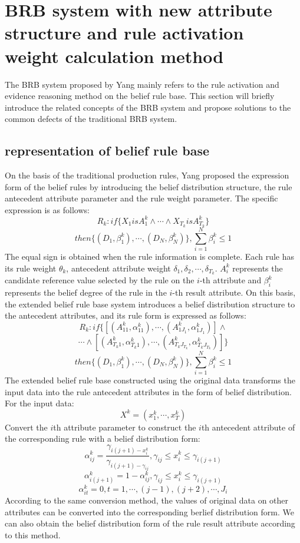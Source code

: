 \documentclass{ieeeaccess}
\begin{document}
\section{BRB system with new attribute structure and rule activation weight calculation method}
The BRB system proposed by Yang mainly refers to the rule activation and evidence reasoning method on the belief rule base. This section will briefly introduce
the related concepts of the BRB system and propose solutions to the common defects of the traditional BRB system.
\subsection{representation of belief rule base}
On the basis of the traditional production rules, Yang\cite{a1} proposed the expression form of the belief rules by introducing the belief distribution structure,
the rule antecedent attribute parameter and the rule weight parameter. The specific expression is as follows:
$$R_k:if\{X_1isA_1^k \wedge \cdots \wedge X_{T_k}isA_{T_k}^k\}$$
$$then\{(D_1,\beta_1^k),\cdots,(D_N,\beta_N^k)\},\sum_{i=1}^N\beta_i^k\leq1$$
The equal sign is obtained when the rule information is complete. Each rule has its rule weight $\theta_k$, antecedent attribute weight $\delta_{1},\delta_{2},\cdots,\delta_{T_k}$.
$A_i^k$ represents the candidate reference value selected by the rule on the $i$-th attribute and $\beta_i^k$ represents the belief degree of the rule in the $i$-th result attribute.
On this basis, the extended belief rule base system introduces a belief distribution structure to the antecedent attributes, and its rule form is expressed as follows:
$$R_k:if\{[(A_{11}^k,\alpha_{11}^k),\cdots,(A_{1J_1}^k,\alpha_{1J_1}^k)] \wedge $$
$$\cdots \wedge [(A_{T_k1}^k,\alpha_{T_k1}^k), \cdots,(A_{T_kJ_{T_k}}^k,\alpha_{T_kJ_{T_k}}^k)]\}$$
$$then\{(D_1,\beta_1^k),\cdots,(D_N,\beta_N^k)\},\sum_{i=1}^N\beta_i^k\leq1$$
The extended belief rule base constructed using the original data transforms the input data into the rule antecedent attributes in the form of belief distribution. For the input data:
$$X^k=(x_1^k,\cdots,x_T^k)$$
Convert the $i$th attribute parameter to construct the $i$th antecedent attribute of the corresponding rule with a belief distribution form:
$$\alpha_{ij}^k=\frac{\gamma_{i(j+1)-x_i^k}}{\gamma_{i(j+1)-\gamma_{ij}}},\gamma_{ij}\leq x_i^k\leq \gamma_{i(j+1)}$$
$$\alpha_{i(j+1)}^k=1-\alpha_{ij}^k,\gamma_{ij}\leq x_i^k\leq \gamma_{i(j+1)}$$
$$\alpha_{it}^k=0,t=1,\cdots,(j-1),(j+2),\cdots,J_i$$
According to the same conversion method, the values of original data on other attributes can be converted into the corresponding berlief distribution form.
We can also obtain the belief distribution form of the rule result attribute according to this method.
\end{document}
